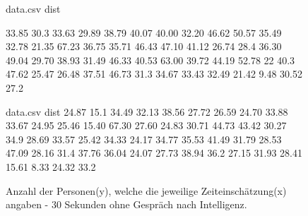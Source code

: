 \documentclass{Paper}
\begin{document}
\begin{figure}[H]
\begin{filecontents}{data.csv}
dist

 33.85
 30.3
 33.63
 29.89
 38.79
 40.07
 40.00
 32.20
 46.62
 50.57
 35.49
 32.78
 21.35
 67.23
 36.75
 35.71
 46.43
 47.10
 41.12
 26.74
 28.4
 36.30
 49.04
 29.70
 38.93
 31.49
 46.33
 40.53
63.00
 39.72
 44.19
 52.78
 22
 40.3
 47.62
 25.47
 26.48
 37.51
 46.73
 31.3
 34.67
 33.43
 32.49
 21.42
 9.48
 30.52
 27.2
\end{filecontents}
\begin{minipage}[t]{0.49\linewidth}
\caption{Anzahl der Personen(y), welche die jeweilige Zeiteinschätzung(x) angaben - 40 Sekunden ohne Gespräch nach Intelligenz.}
\label{HistZeit40sekInt}
\end{minipage}
\hfill
\begin{filecontents}{data.csv}
dist
  24.87
 15.1
 34.49
 32.13
 38.56
 27.72
 26.59
 24.70
 33.88
 33.67
 24.95
 25.46
 15.40
 67.30
 27.60
 24.83
 30.71
 44.73
 43.42
 30.27
 34.9
 28.69
 33.57
 25.42
 34.33
 24.17
 34.77
 35.53
 41.49
 31.79
 28.53
 47.09
 28.16
 31.4
 37.76
 36.04
 24.07
 27.73
 38.94
 36.2
 27.15
 31.93
 28.41
 15.61
 8.33
 24.32
33.2
\end{filecontents}
\begin{minipage}[t]{0.49\linewidth}
\caption{Anzahl der Personen(y), welche die jeweilige Zeiteinschätzung(x) angaben - 30 Sekunden ohne Gespräch nach Intelligenz.}
\label{HistZeit30sekInt}
\end{minipage}
\end{figure}

\end{document}
